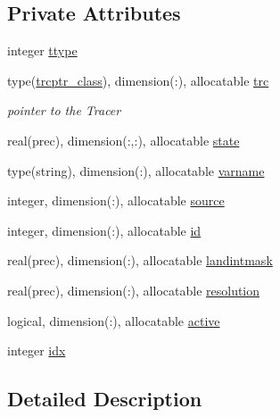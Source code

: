 \subsection*{Private Attributes}
\begin{DoxyCompactItemize}
\item 
integer \mbox{\hyperlink{structstatevector__mod_1_1statevector__class_a01e7628eb9959749a93b74a5bb21754c}{ttype}}
\item 
type(\mbox{\hyperlink{structstatevector__mod_1_1trcptr__class}{trcptr\+\_\+class}}), dimension(\+:), allocatable \mbox{\hyperlink{structstatevector__mod_1_1statevector__class_a510497a5645951832de30b8fd89a1d33}{trc}}
\begin{DoxyCompactList}\small\item\em pointer to the Tracer \end{DoxyCompactList}\item 
real(prec), dimension(\+:,\+:), allocatable \mbox{\hyperlink{structstatevector__mod_1_1statevector__class_a2934e9cc937ca318cbbe490dd391cf88}{state}}
\item 
type(string), dimension(\+:), allocatable \mbox{\hyperlink{structstatevector__mod_1_1statevector__class_acc9916606d867a6fcd9e3a37d68ce302}{varname}}
\item 
integer, dimension(\+:), allocatable \mbox{\hyperlink{structstatevector__mod_1_1statevector__class_a26d6d27fd085846016d83c6e38781416}{source}}
\item 
integer, dimension(\+:), allocatable \mbox{\hyperlink{structstatevector__mod_1_1statevector__class_ae5b035e5a520de4f55c4b5ba6017f82c}{id}}
\item 
real(prec), dimension(\+:), allocatable \mbox{\hyperlink{structstatevector__mod_1_1statevector__class_ac130c9b0a8b974cc8e082a22b6ec2c2c}{landintmask}}
\item 
real(prec), dimension(\+:), allocatable \mbox{\hyperlink{structstatevector__mod_1_1statevector__class_a86a9cabd34ca23e8a4557b9369335f67}{resolution}}
\item 
logical, dimension(\+:), allocatable \mbox{\hyperlink{structstatevector__mod_1_1statevector__class_a78ff040c3a087975ea448f9d1f7d7e1f}{active}}
\item 
integer \mbox{\hyperlink{structstatevector__mod_1_1statevector__class_a7cdf76beffd46644d2ebe4fff6b50b2e}{idx}}
\end{DoxyCompactItemize}


\subsection{Detailed Description}


